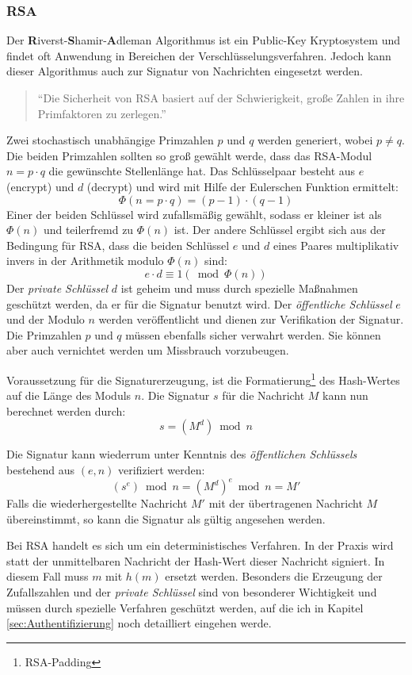 \documentclass[11pt,a4paper,ngerman]{scrreprt}
\begin{document}
\subsubsection{RSA}
Der \textbf{R}iverst-\textbf{S}hamir-\textbf{A}dleman Algorithmus ist ein Public-Key Kryptosystem und findet oft Anwendung in Bereichen der Verschlüsselungsverfahren. Jedoch kann dieser Algorithmus auch zur Signatur von Nachrichten eingesetzt werden. 
\begin{quote}
    ``Die Sicherheit von RSA basiert auf der Schwierigkeit, große Zahlen in ihre Primfaktoren zu zerlegen.'' \cite[S. 82]{ertel12}
\end{quote}
\begin{description}[font=\rmfamily]
    \item[Schlüsselerzeugung:] Zwei stochastisch unabhängige Primzahlen $p$ und $q$ werden generiert, wobei $p \neq q$. Die beiden Primzahlen sollten so groß gewählt werde, dass das RSA-Modul $n=p \cdot q$ die gewünschte Stellenlänge hat. Das Schlüsselpaar besteht aus $e$ (encrypt) und $d$ (decrypt) und wird mit Hilfe der Eulerschen Funktion ermittelt:
    \[
        \Phi(n = p \cdot q) = (p-1) \cdot (q-1)
    \]
    Einer der beiden Schlüssel wird zufallsmäßig gewählt, sodass er kleiner ist als $\Phi(n)$ und teilerfremd zu $\Phi(n)$ ist. Der andere Schlüssel ergibt sich aus der Bedingung für RSA, dass die beiden Schlüssel $e$ und $d$ eines Paares multiplikativ invers in der Arithmetik modulo $\Phi(n)$ sind:
    \[
        e \cdot d \equiv 1 (\bmod \Phi(n)) 
    \]
    Der \emph{private Schlüssel} $d$ ist geheim und muss durch spezielle Maßnahmen geschützt werden, da er für die Signatur benutzt wird. Der \emph{öffentliche Schlüssel} $e$ und der Modulo $n$ werden veröffentlicht und dienen zur Verifikation der Signatur. Die Primzahlen $p$ und $q$ müssen ebenfalls sicher verwahrt werden. Sie können aber auch vernichtet werden um Missbrauch vorzubeugen.
    \item[Signaturerzeugung:] Voraussetzung für die Signaturerzeugung, ist die Formatierung\footnote{RSA-Padding} des Hash-Wertes auf die Länge des Moduls $n$. Die Signatur $s$ für die Nachricht $M$ kann nun berechnet werden durch:
    \[
        s = (M^d) \bmod n    
    \]
    \item[Signaturverifikation:] Die Signatur kann wiederrum unter Kenntnis des \emph{öffentlichen Schlüssels} bestehend aus $(e, n)$ verifiziert werden:
    \[
        (s^e) \bmod n = (M^d)^e \bmod n = M'
    \]
    Falls die wiederhergestellte Nachricht $M'$ mit der übertragenen Nachricht $M$ übereinstimmt, so kann die Signatur als gültig angesehen werden.
    \item[Anmerkungen:] Bei RSA handelt es sich um ein deterministisches Verfahren. In der Praxis wird statt der unmittelbaren Nachricht der Hash-Wert dieser Nachricht signiert. In diesem Fall muss $m$ mit $h(m)$ ersetzt werden. Besonders die Erzeugung der Zufallszahlen und der \emph{private Schlüssel} sind von besonderer Wichtigkeit und müssen durch spezielle Verfahren geschützt werden, auf die ich in Kapitel \ref{sec:Authentifizierung} noch detailliert eingehen werde.
\end{description}
\end{document}
